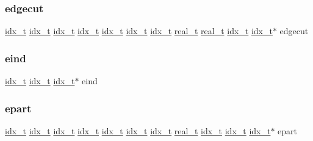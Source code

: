 \mbox{\label{a00879_a8e62a902298dd5fd88ef554d5277b1dc}} 
\subsubsection{\texorpdfstring{edgecut}{edgecut}}
{\footnotesize\ttfamily \hyperlink{a00876_aaa5262be3e700770163401acb0150f52}{idx\+\_\+t} \hyperlink{a00876_aaa5262be3e700770163401acb0150f52}{idx\+\_\+t} \hyperlink{a00876_aaa5262be3e700770163401acb0150f52}{idx\+\_\+t} \hyperlink{a00876_aaa5262be3e700770163401acb0150f52}{idx\+\_\+t} \hyperlink{a00876_aaa5262be3e700770163401acb0150f52}{idx\+\_\+t} \hyperlink{a00876_aaa5262be3e700770163401acb0150f52}{idx\+\_\+t} \hyperlink{a00876_aaa5262be3e700770163401acb0150f52}{idx\+\_\+t} \hyperlink{a00876_a1924a4f6907cc3833213aba1f07fcbe9}{real\+\_\+t} \hyperlink{a00876_a1924a4f6907cc3833213aba1f07fcbe9}{real\+\_\+t} \hyperlink{a00876_aaa5262be3e700770163401acb0150f52}{idx\+\_\+t} \hyperlink{a00876_aaa5262be3e700770163401acb0150f52}{idx\+\_\+t}$\ast$ edgecut}

\mbox{\label{a00879_af06d5753771b844d01c4c20e75c6401b}} 
\subsubsection{\texorpdfstring{eind}{eind}}
{\footnotesize\ttfamily \hyperlink{a00876_aaa5262be3e700770163401acb0150f52}{idx\+\_\+t} \hyperlink{a00876_aaa5262be3e700770163401acb0150f52}{idx\+\_\+t} \hyperlink{a00876_aaa5262be3e700770163401acb0150f52}{idx\+\_\+t}$\ast$ eind}

\mbox{\label{a00879_a3be6f43a8ac8840d4c97578068513c18}} 
\subsubsection{\texorpdfstring{epart}{epart}}
{\footnotesize\ttfamily \hyperlink{a00876_aaa5262be3e700770163401acb0150f52}{idx\+\_\+t} \hyperlink{a00876_aaa5262be3e700770163401acb0150f52}{idx\+\_\+t} \hyperlink{a00876_aaa5262be3e700770163401acb0150f52}{idx\+\_\+t} \hyperlink{a00876_aaa5262be3e700770163401acb0150f52}{idx\+\_\+t} \hyperlink{a00876_aaa5262be3e700770163401acb0150f52}{idx\+\_\+t} \hyperlink{a00876_aaa5262be3e700770163401acb0150f52}{idx\+\_\+t} \hyperlink{a00876_aaa5262be3e700770163401acb0150f52}{idx\+\_\+t} \hyperlink{a00876_a1924a4f6907cc3833213aba1f07fcbe9}{real\+\_\+t} \hyperlink{a00876_aaa5262be3e700770163401acb0150f52}{idx\+\_\+t} \hyperlink{a00876_aaa5262be3e700770163401acb0150f52}{idx\+\_\+t} \hyperlink{a00876_aaa5262be3e700770163401acb0150f52}{idx\+\_\+t}$\ast$ epart}

